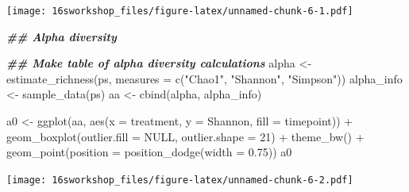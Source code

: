 \documentclass[
]{book}
\newenvironment{Shaded}{\begin{snugshade}}{\end{snugshade}}
\newcommand{\AttributeTok}[1]{\textcolor[rgb]{0.77,0.63,0.00}{#1}}
\newcommand{\ConstantTok}[1]{\textcolor[rgb]{0.00,0.00,0.00}{#1}}
\newcommand{\DecValTok}[1]{\textcolor[rgb]{0.00,0.00,0.81}{#1}}
\newcommand{\DocumentationTok}[1]{\textcolor[rgb]{0.56,0.35,0.01}{\textbf{\textit{#1}}}}
\newcommand{\FloatTok}[1]{\textcolor[rgb]{0.00,0.00,0.81}{#1}}
\newcommand{\FunctionTok}[1]{\textcolor[rgb]{0.00,0.00,0.00}{#1}}
\newcommand{\NormalTok}[1]{#1}
\newcommand{\OtherTok}[1]{\textcolor[rgb]{0.56,0.35,0.01}{#1}}
\newcommand{\SpecialCharTok}[1]{\textcolor[rgb]{0.00,0.00,0.00}{#1}}
\newcommand{\StringTok}[1]{\textcolor[rgb]{0.31,0.60,0.02}{#1}}
\begin{document}
\texttt{[image: 16sworkshop\_files/figure-latex/unnamed-chunk-6-1.pdf]}

\begin{Shaded}
\begin{Highlighting}[]
\DocumentationTok{\#\# Alpha diversity}

\DocumentationTok{\#\# Make table of alpha diversity calculations}
\NormalTok{alpha }\OtherTok{\textless{}{-}} \FunctionTok{estimate\_richness}\NormalTok{(ps, }\AttributeTok{measures =} \FunctionTok{c}\NormalTok{(}\StringTok{"Chao1"}\NormalTok{, }\StringTok{"Shannon"}\NormalTok{, }\StringTok{"Simpson"}\NormalTok{))}
\NormalTok{alpha\_info }\OtherTok{\textless{}{-}} \FunctionTok{sample\_data}\NormalTok{(ps)}
\NormalTok{aa }\OtherTok{\textless{}{-}} \FunctionTok{cbind}\NormalTok{(alpha, alpha\_info)}


\NormalTok{a0 }\OtherTok{\textless{}{-}} \FunctionTok{ggplot}\NormalTok{(aa, }\FunctionTok{aes}\NormalTok{(}\AttributeTok{x =}\NormalTok{ treatment, }\AttributeTok{y =}\NormalTok{ Shannon, }\AttributeTok{fill =}\NormalTok{ timepoint)) }\SpecialCharTok{+}
  \FunctionTok{geom\_boxplot}\NormalTok{(}\AttributeTok{outlier.fill =} \ConstantTok{NULL}\NormalTok{, }\AttributeTok{outlier.shape =} \DecValTok{21}\NormalTok{) }\SpecialCharTok{+}
  \FunctionTok{theme\_bw}\NormalTok{() }\SpecialCharTok{+}
  \FunctionTok{geom\_point}\NormalTok{(}\AttributeTok{position =} \FunctionTok{position\_dodge}\NormalTok{(}\AttributeTok{width =} \FloatTok{0.75}\NormalTok{))}
\NormalTok{a0}
\end{Highlighting}
\end{Shaded}

\texttt{[image: 16sworkshop\_files/figure-latex/unnamed-chunk-6-2.pdf]}
\end{document}

